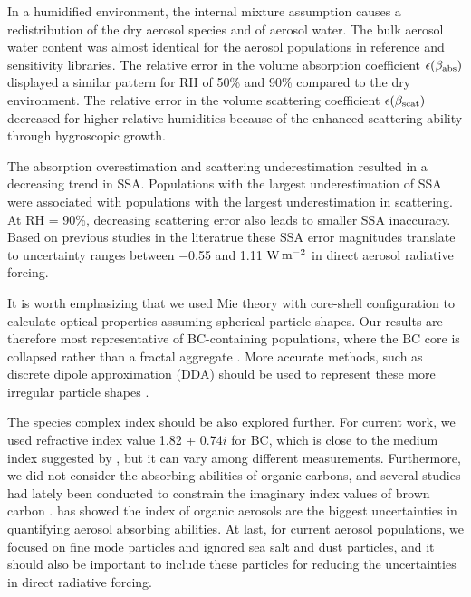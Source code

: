 \documentclass[edeposit,fullpage]{uiucthesis2009}
\makeatletter
\DeclareRobustCommand*\unit[1]
 {\ensuremath{%
   {\thinmuskip3mu\relax
    \def\mu{\text{\textmu}}\def~{\,}%
    \ifx\f@series\testbx\mathbf{#1}\else\mathrm{#1}\fi}}}
\makeatother
\begin{document}
In a humidified environment, the internal mixture assumption causes a
redistribution of the dry aerosol species and of aerosol water. The
bulk aerosol water content was almost identical for the aerosol
populations in reference and sensitivity libraries. The relative error
in the volume absorption coefficient $\epsilon(\beta_{\rm abs})$
displayed a similar pattern for RH of 50\% and 90\% compared to the
dry environment. The relative error in the volume scattering
coefficient $\epsilon(\beta_{\rm scat})$ decreased for higher relative
humidities because of the enhanced scattering ability through
hygroscopic growth. 

The absorption overestimation and scattering underestimation resulted
in a decreasing trend in SSA. Populations with the largest
underestimation of SSA were associated with populations with the
largest underestimation in scattering. At RH = 90\%, decreasing
scattering error also leads to smaller SSA inaccuracy. Based on
previous studies in the literatrue these SSA error magnitudes
translate to uncertainty ranges between $-$0.55 and 1.11 \unit{W\,
  m^{-2}} in direct aerosol radiative forcing.
  
It is worth emphasizing that we used Mie theory with core-shell
configuration to calculate optical properties assuming spherical
particle shapes. Our results are therefore most representative of
BC-containing populations, where the BC core is collapsed rather than
a fractal aggregate \citep{china2013morphology, china2015morphology}. More accurate methods, such as
discrete dipole approximation (DDA) should be used to represent these
more irregular particle shapes \citep{scarnato2013effects,
  curtis2008laboratory,luo2019optical, wu2020light}.

The species complex index should be also explored further. For current
work, we used refractive index value 1.82 + 0.74$i$ for BC, which is
close to the medium index suggested by \citet{stier2007aerosol}, but
it can vary among different measurements.  Furthermore, we did
  not consider the absorbing abilities of organic carbons, and several
  studies had lately been conducted to constrain the imaginary index
  values of brown carbon \citep{liu2020lifecycle}. \citet{Esteve2014}
has showed the index of organic aerosols are the biggest uncertainties
in quantifying aerosol absorbing abilities. At last, for current
aerosol populations, we focused on fine mode particles and ignored sea
salt and dust particles, and it should also be important to include
these particles for reducing the uncertainties in direct radiative
forcing.
\end{document}
